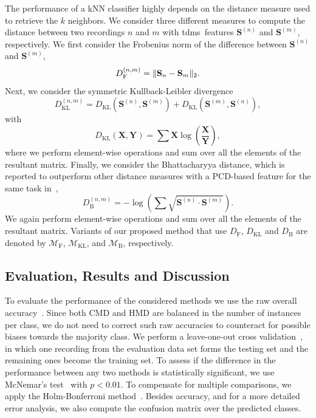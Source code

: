 The performance of a kNN classifier highly depends on the distance measure used to retrieve the $k$ neighbors. We consider three different measures to compute the distance between two recordings $n$ and $m$ with \gls{tdms}\ features $\mathbf{S}^{(n)}$ and $\mathbf{S}^{(m)}$, respectively. We first consider the Frobenius norm of the difference between $\mathbf{S}^{(n)}$ and $\mathbf{S}^{(m)}$,
\begin{equation*}
D_{\mathrm{F}}^{(n,m)} = \lVert\mathbf{S}_{n} - \mathbf{S}_{m}\rVert_2 .
\end{equation*}
Next, we consider the symmetric Kullback-Leibler divergence
\begin{equation*}
D_{\mathrm{KL}}^{(n,m)} = D_{\mathrm{KL}}\left(\mathbf{S}^{(n)},\mathbf{S}^{(m)}\right) + D_{\mathrm{KL}}\left(\mathbf{S}^{(m)},\mathbf{S}^{(n)}\right) ,
\end{equation*}
with
\begin{equation*}
D_{\mathrm{KL}}\left(\mathbf{X},\mathbf{Y}\right) = \sum{\mathbf{X} \log\left(\frac{\mathbf{X}}{\mathbf{Y}} \right)} ,
\end{equation*}
where we perform element-wise operations and sum over all the elements of the resultant matrix. Finally, we consider the Bhattacharyya distance, which is reported to outperform other distance measures with a PCD-based feature for the same task in~\cite{chordia2013joint},
\begin{equation*}
D_{\mathrm{B}}^{(n,m)} = -\log\left( \sum{ \sqrt{ \mathbf{S}^{(n)} \cdot \mathbf{S}^{(m)} } } \right) .
\end{equation*}
We again perform element-wise operations and sum over all the elements of the resultant matrix. Variants of our proposed method that use $D_{\mathrm{F}}$, $D_{\mathrm{KL}}$ and $D_{\mathrm{B}}$ are denoted by $\mathcal{M}_{\mathrm{F}}$, $\mathcal{M}_{\mathrm{KL}}$, and $\mathcal{M}_{\mathrm{B}}$, respectively.



\subsection{Evaluation, Results and Discussion}
\label{sec:tdms_eval_results}

To evaluate the performance of the considered methods we use the raw overall accuracy~\cite{Mitchell97BOOK}. Since both CMD and HMD are balanced in the number of instances per class, we do not need to correct such raw accuracies to counteract for possible biases towards the majority class. We perform a leave-one-out cross validation~\cite{Mitchell97BOOK}, in which one recording from the evaluation data set forms the testing set and the remaining ones become the training set. To assess if the difference in the performance between any two methods is statistically significant, we use McNemar's test~\cite{mcnemar1947note} with $p < 0.01$. To compensate for multiple comparisons, we apply the Holm-Bonferroni method~\cite{holm1979simple}. Besides accuracy, and for a more detailed error analysis, we also compute the confusion matrix over the predicted classes.

